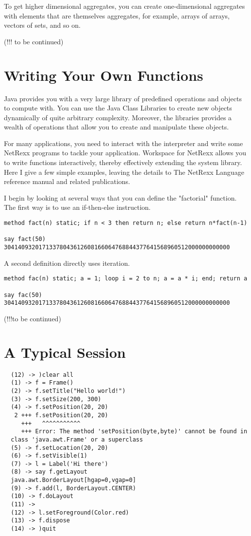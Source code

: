To get higher dimensional aggregates, you can create one-dimensional aggregates with elements that are themselves aggregates, for example, arrays of arrays, vectors of sets, and so on.

(!!! to be continued)

\section{Writing Your Own Functions}

Java provides you with a very large library of predefined operations and objects to compute with. You can use the Java Class Libraries to create new objects dynamically of quite arbitrary complexity. Moreover, the libraries provides a wealth of operations that allow you to create and manipulate these objects.

For many applications, you need to interact with the interpreter and write some NetRexx programs to tackle your application. Workspace for NetRexx allows you to write functions interactively, thereby effectively extending the system library. Here I give a few simple examples, leaving the details to The NetRexx Language reference manual and related publications.

I begin by looking at several ways that you can define the "factorial" function. The first way is to use an if-then-else instruction.
\begin{verbatim}
method fact(n) static; if n < 3 then return n; else return n*fact(n-1)

say fact(50)
30414093201713378043612608166064768844377641568960512000000000000
\end{verbatim}
A second definition directly uses iteration.
\begin{verbatim}
method fac(n) static; a = 1; loop i = 2 to n; a = a * i; end; return a

say fac(50)
30414093201713378043612608166064768844377641568960512000000000000
\end{verbatim}
(!!!to be continued)

 \section{A Typical Session}
\begin{verbatim}
  (12) -> )clear all
  (1) -> f = Frame()
  (2) -> f.setTitle("Hello world!")
  (3) -> f.setSize(200, 300)
  (4) -> f.setPosition(20, 20)
   2 +++ f.setPosition(20, 20)
     +++   ^^^^^^^^^^^
     +++ Error: The method 'setPosition(byte,byte)' cannot be found in
  class 'java.awt.Frame' or a superclass
  (5) -> f.setLocation(20, 20)
  (6) -> f.setVisible(1)
  (7) -> l = Label('Hi there')
  (8) -> say f.getLayout
  java.awt.BorderLayout[hgap=0,vgap=0]
  (9) -> f.add(l, BorderLayout.CENTER)
  (10) -> f.doLayout
  (11) ->
  (12) -> l.setForeground(Color.red)
  (13) -> f.dispose
  (14) -> )quit
\end{verbatim}


